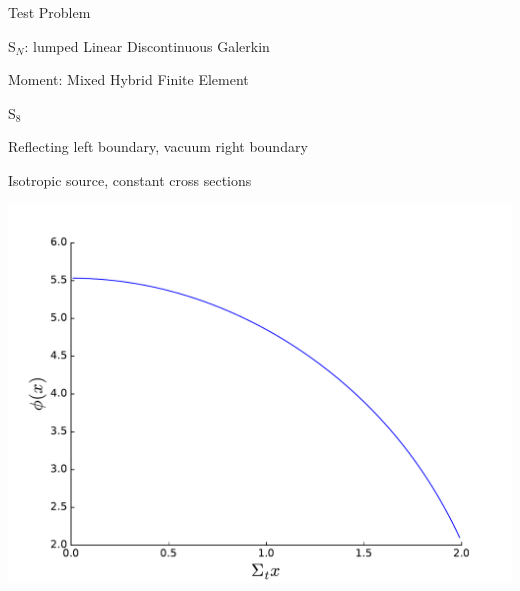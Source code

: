 \documentclass[10pt]{beamer}
\newcommand{\SN}{S$_N$\xspace}
\begin{document}

\begin{frame}{Test Problem}

	\SN: lumped Linear Discontinuous Galerkin 

	\pause
	Moment: Mixed Hybrid Finite Element 

	\pause 
	S$_8$ 

	\pause
	Reflecting left boundary, vacuum right boundary 

	\pause
	Isotropic source, constant cross sections 

	\pause 
	\centerline{\includegraphics[width=.5\paperwidth]{figs/exSol.pdf}}

\end{frame}
\end{document}
